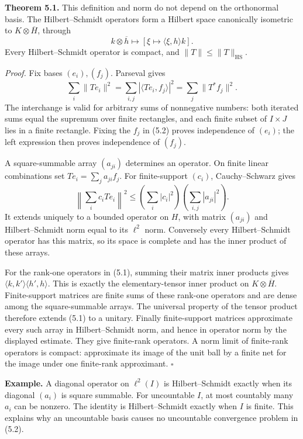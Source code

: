 \documentclass[
  english,
  11pt,
  a4paper,
]{article}
\begin{document}
\textbf{Theorem 5.1.} This definition and norm do not depend on the
orthonormal basis. The Hilbert--Schmidt operators form a Hilbert space
canonically isometric to \(K\otimes\overline H\), through
\[k\otimes\overline h\longmapsto[\xi\mapsto\langle\xi,h\rangle k].
\tag{5.1}\] Every Hilbert--Schmidt operator is compact, and
\(\|T\|\leq\|T\|_{\mathrm{HS}}\).

\emph{Proof.} Fix bases \((e_i),(f_j)\). Parseval gives
\[\sum_i\|Te_i\|^2=\sum_{i,j}|\langle Te_i,f_j\rangle|^2
=\sum_j\|T^*f_j\|^2.
\tag{5.2}\] The interchange is valid for arbitrary sums of nonnegative
numbers: both iterated sums equal the supremum over finite rectangles,
and each finite subset of \(I\times J\) lies in a finite rectangle.
Fixing the \(f_j\) in (5.2) proves independence of \((e_i)\); the left
expression then proves independence of \((f_j)\).

A square-summable array \((a_{ji})\) determines an operator. On finite
linear combinations set \(Te_i=\sum_ja_{ji}f_j\). For finite-support
\((c_i)\), Cauchy--Schwarz gives \[\left\|\sum_i c_iTe_i\right\|^2
\leq\left(\sum_i|c_i|^2\right)\left(\sum_{i,j}|a_{ji}|^2\right).\] It
extends uniquely to a bounded operator on \(H\), with matrix
\((a_{ji})\) and Hilbert--Schmidt norm equal to its \(\ell^2\) norm.
Conversely every Hilbert--Schmidt operator has this matrix, so its space
is complete and has the inner product of these arrays.

For the rank-one operators in (5.1), summing their matrix inner products
gives \(\langle k,k'\rangle\langle h',h\rangle\). This is exactly the
elementary-tensor inner product on \(K\otimes\overline H\).
Finite-support matrices are finite sums of these rank-one operators and
are dense among the square-summable arrays. The universal property of
the tensor product therefore extends (5.1) to a unitary. Finally
finite-support matrices approximate every such array in Hilbert--Schmidt
norm, and hence in operator norm by the displayed estimate. They give
finite-rank operators. A norm limit of finite-rank operators is compact:
approximate its image of the unit ball by a finite net for the image
under one finite-rank approximant. \(\square\)

\textbf{Example.} A diagonal operator on \(\ell^2(I)\) is
Hilbert--Schmidt exactly when its diagonal \((a_i)\) is square summable.
For uncountable \(I\), at most countably many \(a_i\) can be nonzero.
The identity is Hilbert--Schmidt exactly when \(I\) is finite. This
explains why an uncountable basis causes no uncountable convergence
problem in (5.2).
\end{document}
